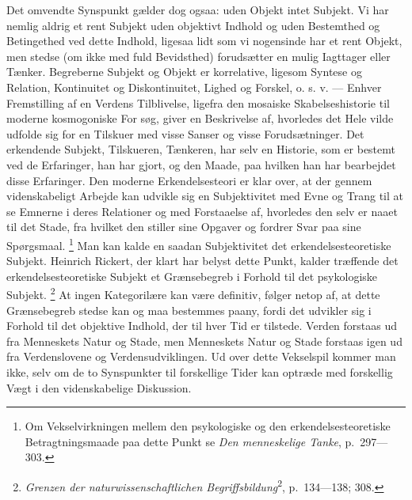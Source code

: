 \documentclass[12pt]{article}
\newcommand{\opage}[1]{\marginnote{\footnotesize\textit{[#1]}}}
\begin{document}
Det omvendte Synspunkt gælder dog ogsaa: uden Objekt intet Subjekt. Vi
har nemlig aldrig et rent Subjekt uden objektivt Indhold og uden
Bestemthed og Betingethed ved dette Indhold, ligesaa lidt som vi
nogensinde har et rent Objekt, men stedse (om ikke med fuld Bevidsthed)
forudsætter en mulig Iagttager eller Tænker. Begreberne Subjekt og Objekt
er korrelative, ligesom Syntese og Relation, Kontinuitet og
Diskontinuitet, Lighed og Forskel, o. s. v. --- Enhver Fremstilling af en
Verdens Tilblivelse, ligefra den mosaiske Skabelseshistorie til moderne
kosmogoniske For%
\opage{61}\setcounter{footnote}{0}%
søg, giver en Beskrivelse af, hvorledes det Hele vilde udfolde sig for en
Tilskuer med visse Sanser og visse Forudsætninger. Det erkendende
Subjekt, Tilskueren, Tænkeren, har selv en Historie, som er bestemt ved
de Erfaringer, han har gjort, og den Maade, paa hvilken han har
bearbejdet disse Erfaringer. Den moderne Erkendelsesteori er klar over,
at der gennem videnskabeligt Arbejde kan udvikle sig en Subjektivitet med
Evne og Trang til at se Emnerne i deres Relationer og med Forstaaelse af,
hvorledes den selv er naaet til det Stade, fra hvilket den stiller sine
Opgaver og fordrer Svar paa sine Spørgsmaal.%
\footnote{Om Vekselvirkningen mellem den psykologiske og den
erkendelsesteoretiske Betragtningsmaade paa dette Punkt se \textit{Den
menneskelige Tanke}, p.~297---303.}
 Man kan kalde en saadan Subjektivitet det erkendelsesteoretiske Subjekt.
Heinrich Rickert, der klart har belyst dette Punkt, kalder træffende det
erkendelsesteoretiske Subjekt et Grænsebegreb i Forhold til det
psykologiske Subjekt.%
\footnote{\textit{Grenzen der naturwissenschaftlichen
Begriffsbildung}\textsuperscript{2}, p.~134---138; 308.}
 At ingen Kategorilære kan være definitiv, følger netop af, at dette
Grænsebegreb stedse kan og maa bestemmes paany, fordi det udvikler sig i
Forhold til det objektive Indhold, der til hver Tid er tilstede. Verden
forstaas ud fra Menneskets Natur og Stade, men Menneskets Natur og Stade
forstaas igen ud fra Verdenslovene og Verdensudviklingen. Ud over dette
Vekselspil kommer man ikke, selv om de to Synspunkter til forskellige
Tider kan optræde med forskellig Vægt i den videnskabelige Diskussion.
\end{document}
